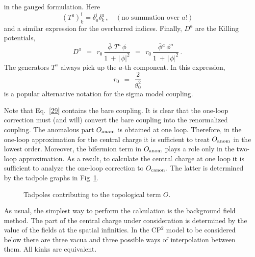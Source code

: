 \documentclass[epsfig,12pt]{article}
\def\beq{\begin{equation}}
\def\eeq{\end{equation}}
\def\beq{\begin{equation}}
\def\eeq{\end{equation}}
\newcommand{\ov}{\overline}
\newcommand{\bphi}{\ov{\phi}{}}
\begin{document}
	in the gauged formulation. 
	Here
 \beq
 	\left(T^a\right)^i_k = \delta_a^i\delta^a_k \,,\quad (\mbox{no summation over $a$!})
 \eeq
	and a similar expression for the overbarred indices.
	Finally,
$ D^a $ 
	are the Killing potentials,
\beq
	D^a  ~~=~~ r_0\, \frac{ \bphi\,\, T^a\, \phi } 
	                    {  1  ~+~  |\phi|^2  }
	     ~~=~~ r_0\, \frac{ \bphi^a\, \phi^a   }
	                    {  1  ~+~  |\phi|^2  }\,.
	                    \label{29}
\eeq
	The generators $ T^a $ always pick up the $ a $-th component.
	In this expression, 
\beq
	r _0  ~~=~~ \frac{ 2 }{ g_0^2}
\eeq 
	is a popular alternative notation for the sigma model coupling.
	
	Note that Eq.~\eqref{29} contains the bare coupling. 
	It is clear that the one-loop correction must (and will) convert the bare coupling  into the renormalized coupling. 
	The anomalous part $O_{\rm anom}$ is obtained at one loop.
	Therefore, in the one-loop approximation for the central charge 
	it is sufficient to treat $O_{\rm anom}$ in the lowest order. Moreover, the bifermion term 
	in $O_{\rm anom}$ plays a role only in the two-loop approximation. 
	As a result, to calculate the central charge at one loop it is sufficient to analyze 
	the one-loop correction to $O_{\rm canon}$. 
	The latter is determined by the tadpole graphs in Fig~\ref{ftad}. 
\begin{figure}
\begin{center}
\epsfxsize=8.0cm
\caption{Tadpoles contributing to the topological term $ O $.}
\label{ftad}
\end{center}
\end{figure}
	As usual, the simplest way to perform the calculation is the background field method.
	The part of the central charge under consideration is determined by the value of the fields at the spatial infinities. 
	In the CP$^2$ model to be considered below there are three vacua and three possible ways
	of interpolation between them. All kinks are equivalent. 
\end{document}

